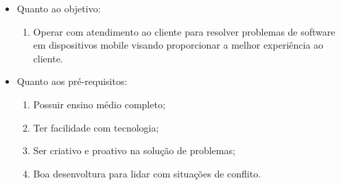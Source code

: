 \documentclass[12pt]{article}
\begin{document}
 \begin{itemize}
\item Quanto ao objetivo:
	\begin{enumerate}
	\item Operar com atendimento ao cliente para resolver problemas de software em dispositivos mobile 		visando proporcionar a melhor experiência ao cliente.
	\end{enumerate}
\end{itemize}

 \begin{itemize}
\item Quanto aos pré-requisitos:
	\begin{enumerate}
   	\item Possuir ensino médio completo;
   	\item Ter facilidade com tecnologia; 
   	\item Ser criativo e proativo na solução de problemas; 
   	\item Boa desenvoltura para lidar com situações de conflito. 
	\end{enumerate}
\end{itemize}
\end{document}
